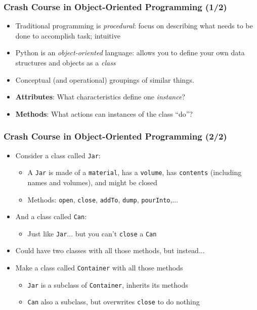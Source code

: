 \documentclass[11ptt]{beamer}
\newcommand{\bi}{\begin{itemize}}
\newcommand{\ei}{\end{itemize}}
\begin{document}
\begin{frame}
\frametitle{Crash Course in Object-Oriented Programming (1/2)}

\begin{itemize}
\item <1->Traditional programming is \textit{procedural}: focus on describing what needs to be done to accomplish task; intuitive

\item <2->Python is an \textit{object-oriented} language: allows you to define your own data structures and objects as a \textit{class}

\item <2->Conceptual (and operational) groupings of similar things.

\item <3->\textbf{Attributes}: What characteristics define one \textit{instance}?

\item <3->\textbf{Methods}: What actions can instances of the class ``do''?

\end{itemize}


\end{frame}


\begin{frame}
\frametitle{Crash Course in Object-Oriented Programming (2/2)}

\bi
\item <1->Consider a class called \texttt{Jar}:
\begin{itemize}
\item A \texttt{Jar} is made of a \texttt{material}, has a \texttt{volume}, has \texttt{contents} (including names and volumes), and might be closed

\item Methods: \texttt{open}, \texttt{close}, \texttt{addTo}, \texttt{dump}, \texttt{pourInto},... 
\end{itemize}

\item <2->And a class called \texttt{Can}:
\begin{itemize}
\item Just like \texttt{Jar}... but you can't \texttt{close} a \texttt{Can}
\end{itemize}

\item <2->Could have two classes with all those methods, but instead...

\item <3->Make a class called \texttt{Container} with all those methods
\begin{itemize}
\item \texttt{Jar} is a subclass of \texttt{Container}, inherits its methods

\item \texttt{Can} also a subclass, but overwrites \texttt{close} to do nothing
\end{itemize}

\ei



\end{frame}
\end{document}

